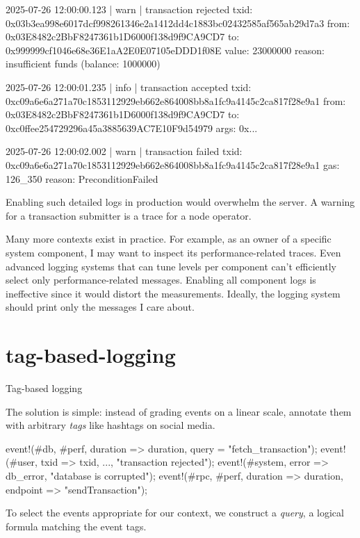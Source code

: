 \documentclass{article}
\begin{document}
\begin{code}
2025-07-26 12:00:00.123 |  warn | transaction rejected
    txid:   0x03b3ea998e6017dcf998261346e2a1412dd4c1883bc02432585af565ab29d7a3
    from:   0x03E8482c2BbF8247361b1D6000f138d9f9CA9CD7
      to:   0x999999cf1046e68e36E1aA2E0E07105eDDD1f08E
    value:  23000000
    reason: insufficient funds (balance: 1000000)

2025-07-26 12:00:01.235 |  info | transaction accepted
    txid: 0xc09a6e6a271a70c1853112929eb662e864008bb8a1fc9a4145c2ca817f28e9a1
    from: 0x03E8482c2BbF8247361b1D6000f138d9f9CA9CD7
      to: 0xc0ffee254729296a45a3885639AC7E10F9d54979
    args: 0x...

2025-07-26 12:00:02.002 |  warn | transaction failed
    txid:   0xc09a6e6a271a70c1853112929eb662e864008bb8a1fc9a4145c2ca817f28e9a1
    gas:    126_350
    reason: PreconditionFailed
\end{code}

Enabling such detailed logs in production would overwhelm the server.
A warning for a transaction submitter is a trace for a node operator.

Many more contexts exist in practice.
For example, as an owner of a specific system component,
I may want to inspect its performance-related traces.
Even advanced logging systems that can tune levels per component can't efficiently select only performance-related messages.
Enabling all component logs is ineffective since it would distort the measurements.
Ideally, the logging system should print only the messages I care about.

\section{tag-based-logging}{Tag-based logging}

The solution is simple: instead of grading events on a linear scale,
annotate them with arbitrary \emph{tags} like hashtags on social media.

\begin{code}[rust]
event!(#db, #perf, duration => duration, query = "fetch_transaction");
\cdots
event!(#user, txid => txid, ..., "transaction rejected");
\cdots
event!(#system, error => db_error, "database is corrupted");
\cdots
event!(#rpc, #perf, duration => duration, endpoint => "sendTransaction");
\end{code}

To select the events appropriate for our context, we construct a \emph{query},
a logical formula matching the event tags.
\end{document}
